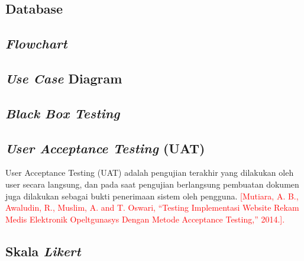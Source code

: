 \begin{flushleft}
\begin{justify}
        \subsection{Database}

        \subsection{\textit{Flowchart}}

        \subsection{\textit{Use Case} Diagram}

        \subsection{\textit{Black Box Testing}}

        \subsection{\textit{User Acceptance Testing} (UAT)}
        \noindent User Acceptance Testing (UAT) adalah pengujian terakhir yang dilakukan oleh user secara langsung, dan pada saat pengujian berlangsung pembuatan dokumen juga dilakukan sebagai bukti penerimaan sistem oleh pengguna. 
        \textcolor{red}{[Mutiara, A. B., Awaludin, R., Muslim, A. and T. Oswari, “Testing Implementasi Website Rekam Medis Elektronik Opeltgunasys Dengan Metode Acceptance Testing,” 2014.].
        }
        

        \subsection{Skala \textit{Likert}}

    \end{justify}



\end{flushleft}



\newpage